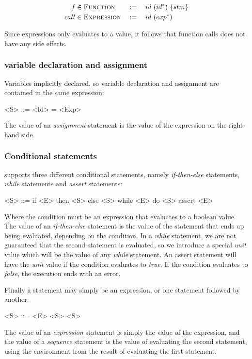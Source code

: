 \begin{alignat*}{3}
	f & \in \textsc{Function} && := \quad id \ (id^{*}) \ \{stm\}\\
	call & \in \textsc{Expression} && := \quad id \ (exp^{*})
\end{alignat*}

Since expressions only evaluates to a value, it follows that function calls does not have any side effects.

\iffalse
\subsubsection{variable declaration and assignment}
Variables implicitly declared, so variable declaration and assignment are contained in the same expression:
\begin{grammar}
	<S> ::= <Id> = <Exp>
\end{grammar} 
The value of an \textsl{assignment}-statement is the value of the expression on the right-hand side.  
\subsubsection{Conditional statements}
\explanguage supports three different conditional statements, namely \textsl{if-then-else} statements, \textsl{while} statements and \textsl{assert} statements:

\begin{grammar}
	<S> ::= if <E> then <S> else <S>
	\alt while <E> do <S>
	\alt assert <E>
\end{grammar}
Where the condition must be an expression that evaluates to a boolean value. 
The value of an \textsl{if-then-else} statement is the value of the statement that ends up being evaluated, depending on the condition. In a \textsl{while} statement, we are not guaranteed that the second statement is evaluated, so we introduce a special \textsl{unit} value which will be the value of any \textsl{while} statement. An assert statement will have the \textsl{unit} value if the condition evaluates to \textsl{true}. If the condition evaluates to \textsl{false}, the execution ends with an error.

\bigskip

Finally a statement may simply be an expression, or one statement followed by another:

\begin{grammar}
	<S> ::= <E>
	 <S>
\end{grammar}
 The value of an \textsl{expression} statement is simply the value of the expression, and the value of a \textsl{sequence} statement is the value of evaluating the second statement, using the environment from the result of evaluating the first statement. 
 


